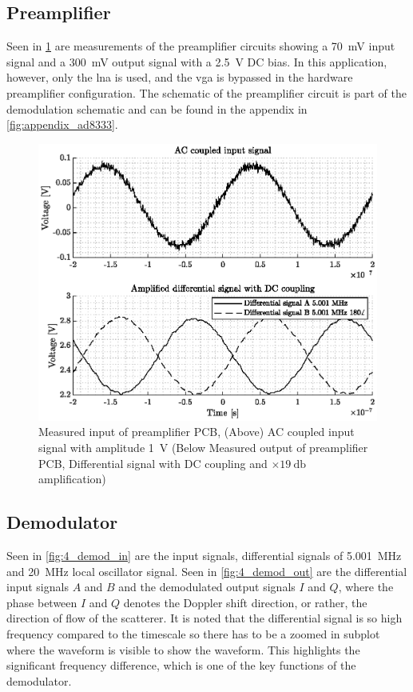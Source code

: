 \subsection{Preamplifier}
Seen in \cref{fig:4_preamp_in} are measurements of the preamplifier circuits showing a \qty{70}{\milli\volt} input signal and a \qty{300}{\milli\volt} output signal with a \qty{2.5}{\volt} DC bias. In this application, however, only the \gls{lna} is used, and the \gls{vga} is bypassed in the hardware preamplifier configuration. The schematic of the preamplifier circuit is part of the demodulation schematic and can be found in the appendix in \cref{fig:appendix_ad8333}.
\begin{figure}[htbp]
	\centering
	\includegraphics[width=.8\textwidth]{Figures/4_preamplifier_pcb.eps}
	\caption[Measured input and output of preamplifier PCB]{Measured input of preamplifier PCB, (Above) AC coupled input signal with amplitude \qty{1}{\volt} (Below Measured output of preamplifier PCB, Differential signal with DC coupling and $\times \qty{19}{\decibel}$ amplification)}
	\label{fig:4_preamp_in}
\end{figure}

\subsection{Demodulator}
Seen in \cref{fig:4_demod_in} are the input signals, differential signals of \qty{5.001}{\mega\hertz} and \qty{20}{\mega\hertz} local oscillator signal. Seen in \cref{fig:4_demod_out} are the differential input signals $A$ and $B$ and the demodulated output signals $I$ and $Q$, where the phase between $I$ and $Q$ denotes the Doppler shift direction, or rather, the direction of flow of the scatterer. It is noted that the differential signal is so high frequency compared to the timescale so there has to be a zoomed in subplot where the waveform is visible to show the waveform. This highlights the significant frequency difference, which is one of the key functions of the demodulator.

